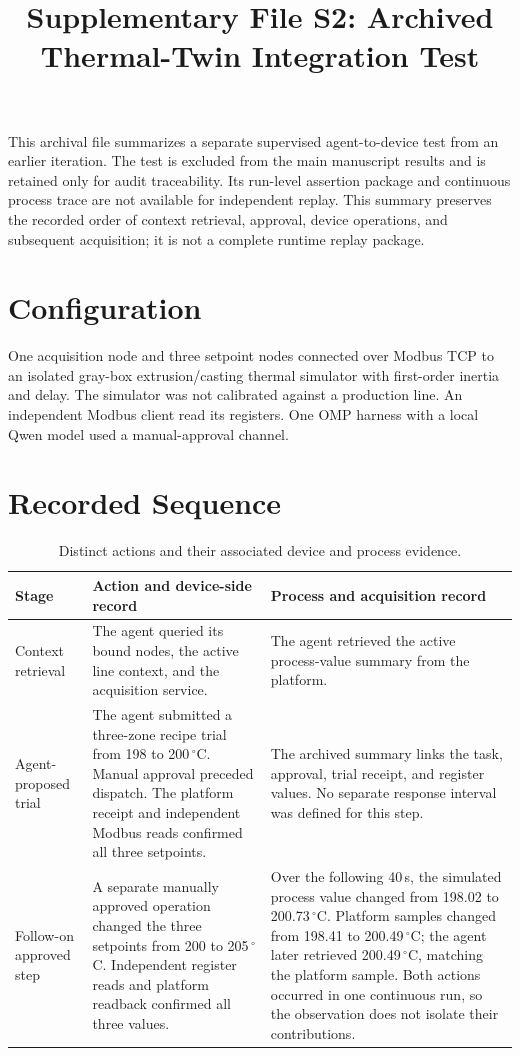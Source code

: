 \documentclass[10pt]{article}
\title{Supplementary File S2: Archived Thermal-Twin Integration Test}
\author{}
\date{}
\begin{document}
\maketitle

This archival file summarizes a separate supervised agent-to-device test from
an earlier iteration. The test is excluded from the main manuscript results
and is retained only for audit traceability. Its run-level assertion package
and continuous process trace are not available for independent replay. This
summary preserves the recorded order of context retrieval, approval, device
operations, and subsequent acquisition; it is not a complete runtime replay
package.

\section{Configuration}
One acquisition node and three setpoint nodes connected over Modbus TCP to an
isolated gray-box extrusion/casting thermal simulator with first-order inertia
and delay. The simulator was not calibrated against a production line. An
independent Modbus client read its registers. One OMP harness with a local
Qwen model used a manual-approval channel.

\section{Recorded Sequence}
\begin{table}[ht]
\centering
\caption{Distinct actions and their associated device and process evidence.}
\label{tab:s2-sequence}
\footnotesize
\renewcommand{\arraystretch}{1.12}
\begin{tabularx}{\textwidth}{@{}>{\raggedright\arraybackslash}p{2.5cm}X X@{}}
\toprule
Stage & Action and device-side record & Process and acquisition record \\
\midrule
Context retrieval & The agent queried its bound nodes, the active line context,
and the acquisition service. & The agent retrieved the active process-value
summary from the platform. \\
Agent-proposed trial & The agent submitted a three-zone recipe trial from 198
to 200\,$^{\circ}$C. Manual approval preceded dispatch. The platform receipt
and independent Modbus reads confirmed all three setpoints. & The archived
summary links the task, approval, trial receipt, and register values. No
separate response interval was defined for this step. \\
Follow-on approved step & A separate manually approved operation changed the
three setpoints from 200 to 205\,$^{\circ}$C. Independent register reads and
platform readback confirmed all three values. & Over the following 40\,s, the
simulated process value changed from 198.02 to 200.73\,$^{\circ}$C. Platform
samples changed from 198.41 to 200.49\,$^{\circ}$C; the agent later retrieved
200.49\,$^{\circ}$C, matching the platform sample. Both actions occurred in
one continuous run, so the observation does not isolate their contributions. \\
\bottomrule
\end{tabularx}
\end{table}
\end{document}
